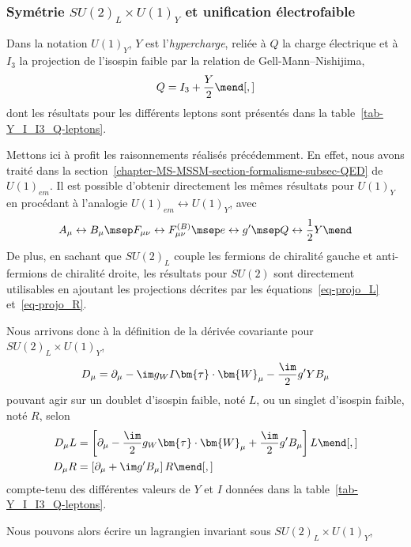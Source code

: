 \subsubsection{Symétrie $SU(2)_L \times U(1)_Y$ et unification électrofaible}\label{chapter-MS-MSSM-section-formalisme-subsec-EW-U1}
Dans la notation $U(1)_Y$, $Y$ est l'\emph{hypercharge}, reliée à $Q$ la charge électrique et à $I_3$ la projection de l'isospin faible par la relation de Gell-Mann--Nishijima,
\begin{equation}
Q = I_3 + \frac{Y}{2}
\mend[,]
\end{equation}
dont les résultats pour les différents leptons sont présentés dans la table~\ref{tab-Y_I_I3_Q-leptons}.
\par Mettons ici à profit les raisonnements réalisés précédemment. En effet, nous avons traité dans la section~\ref{chapter-MS-MSSM-section-formalisme-subsec-QED} de $U(1)_{em}$. Il est possible d'obtenir directement les mêmes résultats pour $U(1)_Y$ en procédant à l'analogie $U(1)_{em}\leftrightarrow U(1)_Y$, avec
\begin{equation}
A_\mu \leftrightarrow B_\mu
\msep
F_{\mu\nu} \leftrightarrow F^{(B)}_{\mu\nu}
\msep
e \leftrightarrow g'
\msep
Q \leftrightarrow \frac{1}{2}Y
\mend
\end{equation}
De plus, en sachant que $SU(2)_L$ couple les fermions de chiralité gauche et anti-fermions de chiralité droite, les résultats pour $SU(2)$ sont directement utilisables en ajoutant les projections décrites par les équations~\eqref{eq-projo_L} et~\eqref{eq-projo_R}.
\par Nous arrivons donc à la définition de la dérivée covariante pour $SU(2)_L \times U(1)_Y$,
\begin{equation}
D_\mu = \partial_\mu - \im g_WI \bm{\tau}\cdot\bm{W}_\mu - \frac{\im}{2}g'YB_\mu
\label{eq-definition_Dmu_EW}
\end{equation}
pouvant agir sur un doublet d'isospin faible, noté $L$, ou un singlet d'isospin faible, noté $R$, selon
\begin{align}
D_\mu L &= \left[ \partial_\mu - \frac{\im}{2}g_W \bm{\tau}\cdot\bm{W}_\mu + \frac{\im}{2}g'B_\mu \right] L
\mend[,]
\\
D_\mu R &= \left[ \partial_\mu + \im g'B_\mu \right] R
\mend[,]
\end{align}
compte-tenu des différentes valeurs de $Y$ et $I$ données dans la table~\ref{tab-Y_I_I3_Q-leptons}.
\par Nous pouvons alors écrire un lagrangien invariant sous $SU(2)_L\times U(1)_Y$,
